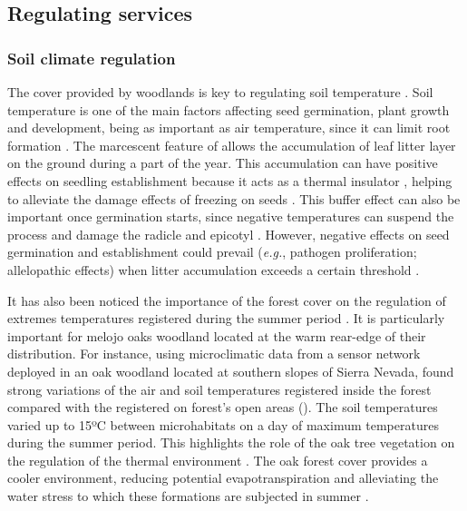 \subsection{Regulating services}\label{sec:es:regulation}
\subsubsection{Soil climate regulation}\label{sec:es:regulation-soil}
The cover provided by woodlands is key to regulating soil temperature \autocite{Ellisonetal2017TreesForests}. Soil temperature is one of the main factors affecting seed germination, plant growth and development, being as important as air temperature, since it can limit root formation \autocites{AlvarezUriaKorner2007LowTemperature}. The marcescent feature of \Qp allows the accumulation of leaf litter layer on the ground during a part of the year. This accumulation can have positive effects on seedling establishment because it acts as a thermal insulator \autocites{Loydietal2014DistributionEffects}, helping to alleviate the damage effects of freezing on seeds \autocites{Loydietal2014DistributionEffects,CavenderBaresetal2005SummerWinter,EstesoMartinezGilPelegrin2004FrostResistance,Lofetal2019TammReview}. This buffer effect can also be important once germination starts, since negative temperatures can suspend the process and damage the radicle and epicotyl \autocites{AizenWoodcock1996EffectsAcorn}. However, negative effects on seed germination and establishment could prevail (\emph{e.g.}, pathogen proliferation; allelopathic effects) when litter accumulation exceeds a certain threshold \autocites{Loydietal2014DistributionEffects,XiongNilsson1999EffectsPlant}.

It has also been noticed the importance of the forest cover on the regulation of extremes temperatures registered during the summer period \autocites{DeFrenneetal2021ForestMicroclimates}. It is particularly important for melojo oaks woodland located at the warm rear-edge of their distribution. For instance, using microclimatic data from a sensor network deployed in an oak woodland located at southern slopes of Sierra Nevada, \citet{Zamoraetal2021UniendoMacro} found strong variations of the air and soil temperatures registered inside the \Qp forest compared with the registered on forest's open areas (). The soil temperatures varied up to 15ºC between microhabitats on a day of maximum temperatures during the summer period. This highlights the role of the oak tree vegetation on the regulation of the thermal environment \autocites{Niinemets2010ResponsesForest}. The oak forest cover provides a cooler environment, reducing potential evapotranspiration and alleviating the water stress to which these formations are subjected in summer \autocites{Zamoraetal2021UniendoMacro}.  

